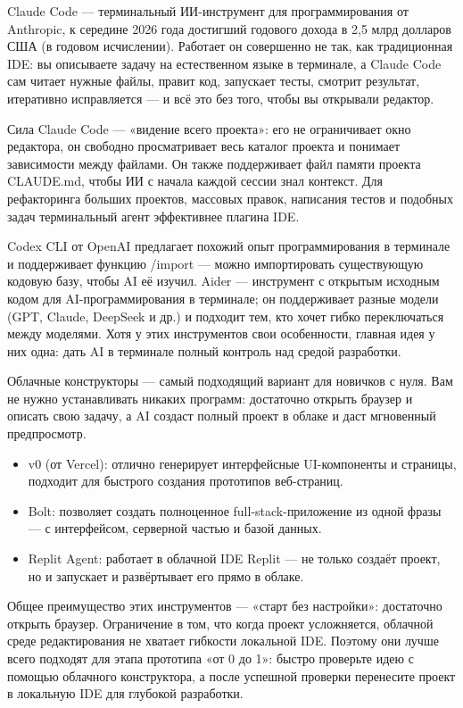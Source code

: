 Claude Code — терминальный ИИ-инструмент для программирования от Anthropic, к середине 2026 года достигший годового дохода в 2,5 млрд долларов США (в годовом исчислении). Работает он совершенно не так, как традиционная IDE: вы описываете задачу на естественном языке в терминале, а Claude Code сам читает нужные файлы, правит код, запускает тесты, смотрит результат, итеративно исправляется — и всё это без того, чтобы вы открывали редактор.

Сила Claude Code — «видение всего проекта»: его не ограничивает окно редактора, он свободно просматривает весь каталог проекта и понимает зависимости между файлами. Он также поддерживает файл памяти проекта CLAUDE.md, чтобы ИИ с начала каждой сессии знал контекст. Для рефакторинга больших проектов, массовых правок, написания тестов и подобных задач терминальный агент эффективнее плагина IDE.


Codex CLI от OpenAI предлагает похожий опыт программирования в терминале и поддерживает функцию /import — можно импортировать существующую кодовую базу, чтобы AI её изучил. Aider — инструмент с открытым исходным кодом для AI-программирования в терминале; он поддерживает разные модели (GPT, Claude, DeepSeek и др.) и подходит тем, кто хочет гибко переключаться между моделями. Хотя у этих инструментов свои особенности, главная идея у них одна: дать AI в терминале полный контроль над средой разработки.


Облачные конструкторы — самый подходящий вариант для новичков с нуля. Вам не нужно устанавливать никаких программ: достаточно открыть браузер и описать свою задачу, а AI создаст полный проект в облаке и даст мгновенный предпросмотр.

\begin{itemize}
  \item v0 (от Vercel): отлично генерирует интерфейсные UI-компоненты и страницы, подходит для быстрого создания прототипов веб-страниц.
  \item Bolt: позволяет создать полноценное full-stack-приложение из одной фразы — с интерфейсом, серверной частью и базой данных.
  \item Replit Agent: работает в облачной IDE Replit — не только создаёт проект, но и запускает и развёртывает его прямо в облаке.
\end{itemize}

Общее преимущество этих инструментов — «старт без настройки»: достаточно открыть браузер. Ограничение в том, что когда проект усложняется, облачной среде редактирования не хватает гибкости локальной IDE. Поэтому они лучше всего подходят для этапа прототипа «от 0 до 1»: быстро проверьте идею с помощью облачного конструктора, а после успешной проверки перенесите проект в локальную IDE для глубокой разработки.

